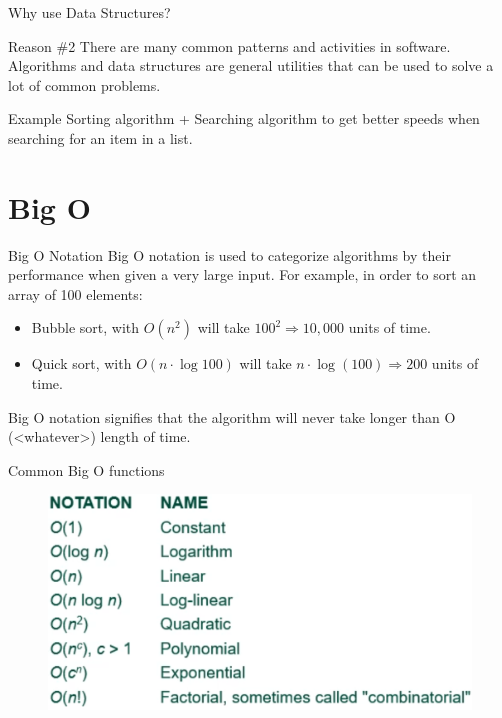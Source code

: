 \documentclass[table,xcolor=table]{IFMG-beamer}
\begin{document}
\begin{frame}{Why use Data Structures?}
\begin{block}{Reason \#2}
  There are many common patterns and activities in software. Algorithms and data structures are general utilities that can be used to solve a lot of common problems.
  \end{block}
\begin{exampleblock}{Example}
  Sorting algorithm + Searching algorithm to get better speeds when searching for an item in a list.
\end{exampleblock}
\end{frame}

\section{Big O}

\begin{frame}{Big O Notation}
  Big O notation is used to categorize algorithms by their performance when given a very large input. For example, in order to sort an array of 100 elements:
  \medskip

	\begin{itemize}[<+->]
    \item Bubble sort, with $O(n^2)$ will take $100^2 \Rightarrow 10,000$ units of time.
    \item Quick sort, with $O(n \cdot \log 100)$ will take $n \cdot \log(100) \Rightarrow 200$ units of time.
  \end{itemize}
  \medskip
  
  Big O notation signifies that the algorithm will never take longer than O (<whatever>) length of time.
\end{frame}

\begin{frame}{Common Big O functions}

\begin{figure}
\centering
\includegraphics[width=0.8\linewidth]{figs/common_functions.png}

\end{figure}

\end{frame}
\end{document}

